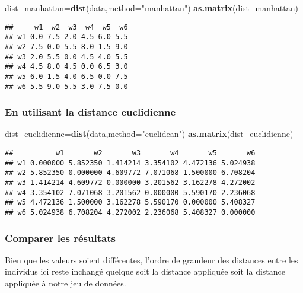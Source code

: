 \documentclass[]{article}
\newenvironment{Shaded}{\begin{snugshade}}{\end{snugshade}}
\newcommand{\DataTypeTok}[1]{\textcolor[rgb]{0.13,0.29,0.53}{#1}}
\newcommand{\KeywordTok}[1]{\textcolor[rgb]{0.13,0.29,0.53}{\textbf{#1}}}
\newcommand{\NormalTok}[1]{#1}
\newcommand{\StringTok}[1]{\textcolor[rgb]{0.31,0.60,0.02}{#1}}
\begin{document}
\begin{Shaded}
\begin{Highlighting}[]
\NormalTok{dist_manhattan=}\KeywordTok{dist}\NormalTok{(data,}\DataTypeTok{method=}\StringTok{"manhattan"}\NormalTok{)}
\KeywordTok{as.matrix}\NormalTok{(dist_manhattan)}
\end{Highlighting}
\end{Shaded}

\begin{verbatim}
##     w1  w2  w3  w4  w5  w6
## w1 0.0 7.5 2.0 4.5 6.0 5.5
## w2 7.5 0.0 5.5 8.0 1.5 9.0
## w3 2.0 5.5 0.0 4.5 4.0 5.5
## w4 4.5 8.0 4.5 0.0 6.5 3.0
## w5 6.0 1.5 4.0 6.5 0.0 7.5
## w6 5.5 9.0 5.5 3.0 7.5 0.0
\end{verbatim}

\hypertarget{en-utilisant-la-distance-euclidienne}{%
\subsubsection{En utilisant la distance
euclidienne}\label{en-utilisant-la-distance-euclidienne}}

\begin{Shaded}
\begin{Highlighting}[]
\NormalTok{dist_euclidienne=}\KeywordTok{dist}\NormalTok{(data,}\DataTypeTok{method=}\StringTok{"euclidean"}\NormalTok{)}
\KeywordTok{as.matrix}\NormalTok{(dist_euclidienne)}
\end{Highlighting}
\end{Shaded}

\begin{verbatim}
##          w1       w2       w3       w4       w5       w6
## w1 0.000000 5.852350 1.414214 3.354102 4.472136 5.024938
## w2 5.852350 0.000000 4.609772 7.071068 1.500000 6.708204
## w3 1.414214 4.609772 0.000000 3.201562 3.162278 4.272002
## w4 3.354102 7.071068 3.201562 0.000000 5.590170 2.236068
## w5 4.472136 1.500000 3.162278 5.590170 0.000000 5.408327
## w6 5.024938 6.708204 4.272002 2.236068 5.408327 0.000000
\end{verbatim}

\hypertarget{comparer-les-ruxe9sultats}{%
\subsubsection{Comparer les résultats}\label{comparer-les-ruxe9sultats}}

Bien que les valeurs soient différentes, l'ordre de grandeur des
distances entre les individus ici reste inchangé quelque soit la
distance appliquée soit la distance appliquée à notre jeu de données.
\end{document}
